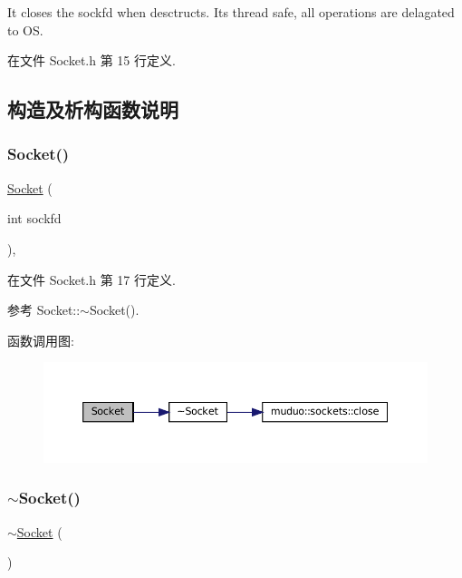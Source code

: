 It closes the sockfd when desctructs. It\textquotesingle{}s thread safe, all operations are delagated to OS. 

在文件 Socket.\+h 第 15 行定义.



\subsection{构造及析构函数说明}
\mbox{\label{classmuduo_1_1Socket_ad649516e0d40b6d9485a8218125414a4}} 
\subsubsection{\texorpdfstring{Socket()}{Socket()}}
{\footnotesize\ttfamily \hyperlink{classmuduo_1_1Socket}{Socket} (\begin{DoxyParamCaption}\item[{int}]{sockfd }\end{DoxyParamCaption})\hspace{0.3cm}{\ttfamily [inline]}, {\ttfamily [explicit]}}



在文件 Socket.\+h 第 17 行定义.



参考 Socket\+::$\sim$\+Socket().

函数调用图\+:
\nopagebreak
\begin{figure}[H]
\begin{center}
\leavevmode
\includegraphics[width=350pt]{classmuduo_1_1Socket_ad649516e0d40b6d9485a8218125414a4_cgraph}
\end{center}
\end{figure}
\mbox{\label{classmuduo_1_1Socket_af387aca495ea9a25c511cd7d02d997bb}} 
\subsubsection{\texorpdfstring{$\sim$\+Socket()}{~Socket()}}
{\footnotesize\ttfamily $\sim$\hyperlink{classmuduo_1_1Socket}{Socket} (\begin{DoxyParamCaption}{ }\end{DoxyParamCaption})}



